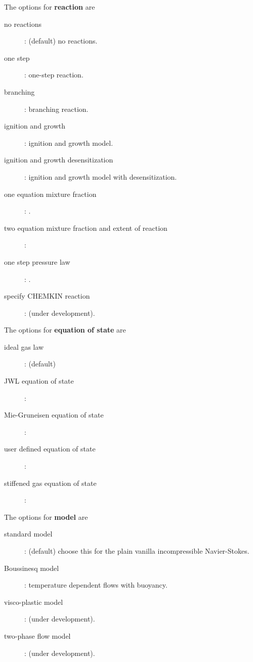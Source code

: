 \documentclass{article}
\begin{document}

\noindent The options for {\bf reaction} are
\begin{description}
  \item[\qquad no reactions] : (default) no reactions.
  \item[\qquad one step] : one-step reaction.
  \item[\qquad branching] : branching reaction.
  \item[\qquad ignition and growth] : ignition and growth model.
  \item[\qquad ignition and growth desensitization] : ignition and growth model with desensitization.
  \item[\qquad one equation mixture fraction] : .
  \item[\qquad two equation mixture fraction and extent of reaction] :
  \item[\qquad one step pressure law] : .
  \item[\qquad specify CHEMKIN reaction] : (under development). 
\end{description}

\noindent The options for {\bf equation of state} are
\begin{description}
  \item[\qquad ideal gas law] : (default) 
  \item[\qquad JWL equation of state] : 
  \item[\qquad Mie-Gruneisen equation of state] : 
  \item[\qquad user defined equation of state] : 
  \item[\qquad stiffened gas equation of state] : 
\end{description}


\noindent The options for {\bf model} are
\begin{description}
  \item[\qquad standard model] : (default) choose this for the plain vanilla incompressible Navier-Stokes. 
  \item[\qquad Boussinesq model] : temperature dependent flows with buoyancy. 
  \item[\qquad visco-plastic model] : (under development). 
  \item[\qquad two-phase flow model] : (under development). 
\end{description}
\end{document}
